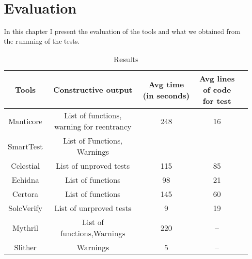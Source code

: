 
\chapter{Evaluation}
\label{ch:Evaluation}

In this chapter I present the evaluation of the tools and what we obtained from the runnning of the tests.

\begin{table*}
    \footnotesize
    \caption{Results}

    \label{tab:Results}
    \begin{tabular}{ccccl}
    \toprule
     Tools  &  Constructive output & Avg time (in seconds) & Avg lines of code for test \\
      \midrule
        Manticore & List of functions, warning for reentrancy  & 248  &  16 \\
        SmartTest & List of Functions, Warnings  &  &    \\
        Celestial & List of unproved tests & 115  &  85  \\
        Echidna & List of functions  & 98  &  21 \\
        Certora & List of functions   & 145  &  60  \\ 
        SolcVerify & List of unrproved tests  & 9  &  19  \\
        Mythril & List of functions,Warnings  & 220  &  --  \\ 
        Slither& Warnings & 5  &  --  \\ 
        
    \bottomrule
    \end{tabular}
\end{table*}

